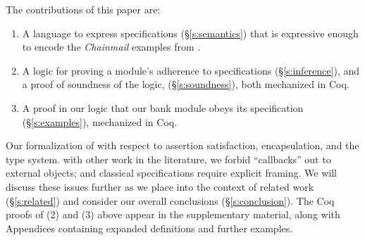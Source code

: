 %
The contributions of this paper are:\begin{enumerate}
 \item
A  language to
express \Nec specifications (\S\ref{s:semantics}) that is  expressive
enough to encode the \emph{Chainmail} examples from . 
 \item
A  logic for proving a module's adherence to 
 \Nec specifications (\S\ref{s:inference}), and a proof of soundness of the logic, (\S\ref{s:soundness}),
both mechanized in Coq. 
 \item
A proof in our logic %
  that our bank module obeys its \Nec specification (\S\ref{s:examples}), mechanized in Coq.
\end{enumerate}



Our formalization of \Nec %
 with respect to assertion
satisfaction, encapsulation, and the type system.
 { with other work in the literature,} we forbid 
``callbacks'' out to external objects; and
classical specifications require explicit framing.
We will discuss these  issues %
further as we place \Nec into the context of 
related work (\S\ref{s:related}) and consider our overall conclusions
(\S\ref{s:conclusion}). 
%
The Coq proofs of 
(2) and (3) above appear in the
supplementary material, along with Appendices containing expanded 
definitions and further examples.
